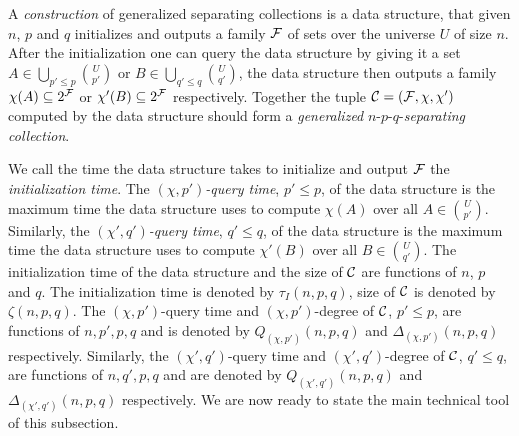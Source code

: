 A {\em construction} of generalized separating collections is a data structure, that given $n$, $p$ and $q$ initializes and outputs a family ${\cal F}$ of sets over the universe $U$ of size $n$. 
After the initialization one can query the data structure by giving it a set  $A \in \bigcup_{p'\leq p}{U \choose p'}$ or $B\in \bigcup_{q'\leq q}{U \choose q'}$, the data structure 
then outputs a family  $\chi(A) \subseteq 2^{\cal F}$ or $\chi'(B)\subseteq 2^{\cal F}$ respectively. Together the tuple ${\cal C}= ({\cal F},\chi, \chi')$ computed by the data structure 
should form a {\em generalized} $n$-$p$-$q$-{\em separating collection}.

We call the time the data structure takes to initialize and output ${\cal F}$ the {\em initialization time}. 
The {\em $(\chi,p')$-query time}, $p'\leq p$, of the data structure is the maximum time the data structure uses to compute $\chi(A)$ over all $A \in {U \choose p'}$. Similarly, the 
{\em $(\chi',q')$-query time}, $q'\leq q$, of the data structure is the maximum time the data structure uses to compute $\chi'(B)$ over all $B \in {U \choose q'}$.
The initialization time of the data structure and the size of ${\cal C}$ are functions of  $n$, $p$ and $q$. The initialization time is denoted by 
$\tau_I(n,p,q)$, size of ${\cal C}$ is denoted by $\zeta(n,p,q)$. The $(\chi,p')$-query time and $(\chi,p')$-degree of 
$\cal C$, $p'\leq p$, are functions of 
$n,p',p,q$ and is denoted by ${Q_{(\chi,p')}}(n,p,q)$ and $\Delta_{(\chi,p')}(n,p,q)$ respectively. Similarly, the $(\chi',q')$-query time and $(\chi',q')$-degree of ${\cal C}$, $q'\leq q$,  are functions of 
$n,q',p,q$ and are denoted by ${Q_{(\chi',q')}}(n,p,q)$ and $\Delta_{(\chi',q')}(n,p,q)$ respectively.  
We are now ready to state the main technical  tool of this subsection.



